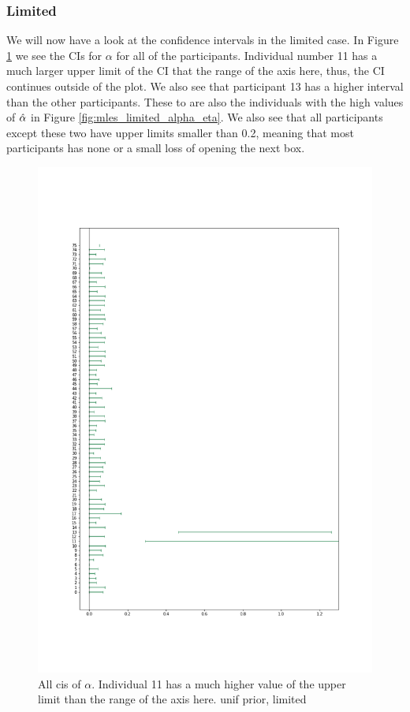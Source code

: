 \subsubsection{Limited}
We will now have a look at the confidence intervals in the limited case. In Figure \ref{fig:all_cis_alpha_lim} we see the CIs for $\alpha$ for all of the participants. Individual number 11 has a much larger upper limit of the CI that the range of the axis here, thus, the CI continues outside of the plot. We also see that participant 13 has a higher interval than the other participants. These to are also the individuals with the high values of $\hat{\alpha}$ in Figure \ref{fig:mles_limited_alpha_eta}. We also see that all participants except these two have upper limits smaller than 0.2, meaning that most participants has none or a small loss of opening the next box. 
\begin{figure}
    \centering
    \includegraphics[scale=0.37]{pictures/all_cis_lim_alpha.png} %
    \caption{All cis of $\alpha$. Individual 11 has a much higher value of the upper limit than the range of the axis here.  unif prior, limited}
    \label{fig:all_cis_alpha_lim}
\end{figure}


